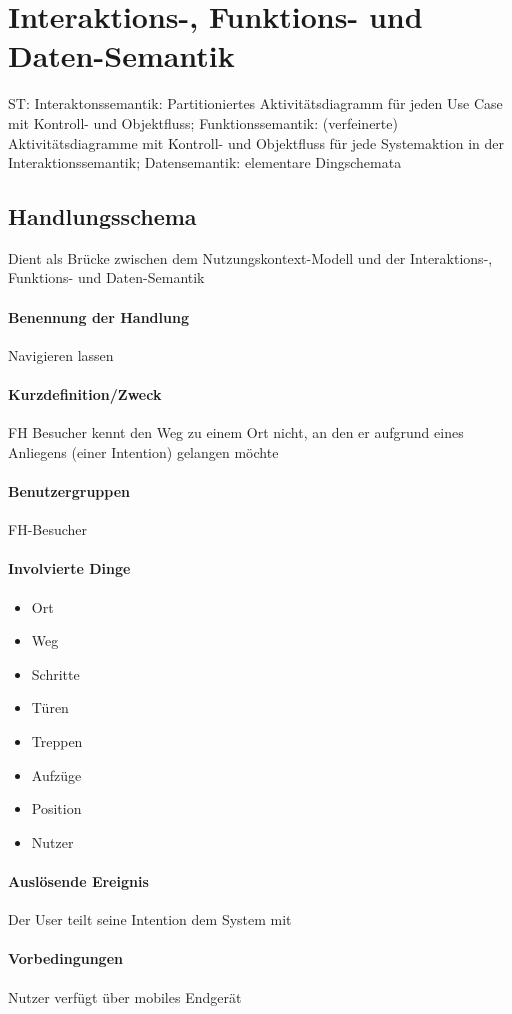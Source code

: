 \chapter{Interaktions-, Funktions- und Daten-Semantik}
ST: Interaktonssemantik: Partitioniertes Aktivitätsdiagramm für jeden Use
Case mit Kontroll- und Objektfluss;
Funktionssemantik: (verfeinerte) Aktivitätsdiagramme mit Kontroll- und
Objektfluss für jede Systemaktion in der Interaktionssemantik;
Datensemantik: elementare Dingschemata

\section{Handlungsschema}
Dient als Brücke zwischen dem Nutzungskontext-Modell und der Interaktions-, Funktions- und Daten-Semantik

\subsubsection*{Benennung der Handlung}
Navigieren lassen
\subsubsection*{Kurzdefinition/Zweck}
FH Besucher kennt den Weg zu einem Ort nicht, an den er aufgrund eines Anliegens (einer Intention) gelangen möchte
\subsubsection*{Benutzergruppen}
FH-Besucher
\subsubsection*{Involvierte Dinge}
\begin{itemize}
\item Ort
\item Weg
\item Schritte
\item Türen
\item Treppen
\item Aufzüge
\item Position
\item Nutzer
\end{itemize}
\subsubsection*{Auslösende Ereignis}
Der User teilt seine Intention dem System mit 
\subsubsection*{Vorbedingungen} 
Nutzer verfügt über mobiles Endgerät 

